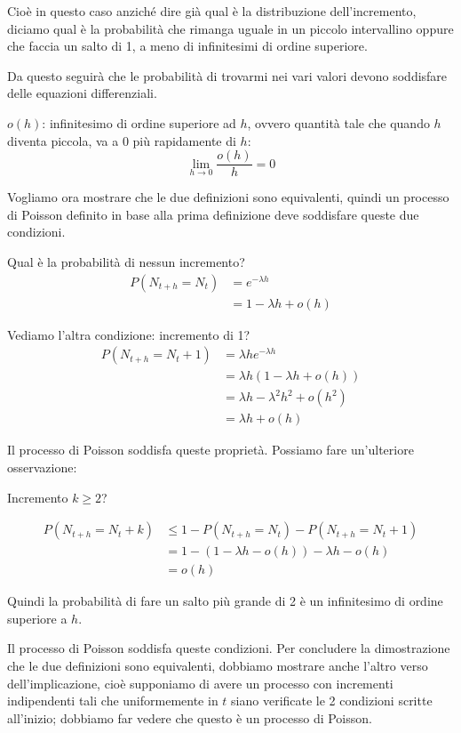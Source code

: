 \documentclass[a4paper,12pt]{book}
\begin{document}
Cioè in questo caso anziché dire già qual è la distribuzione dell'incremento, diciamo qual è la probabilità che rimanga uguale in un piccolo intervallino oppure che faccia un salto di 1, a meno di infinitesimi di ordine superiore.

Da questo seguirà che le probabilità di trovarmi nei vari valori devono soddisfare delle equazioni differenziali. 

$ o(h) $: infinitesimo di ordine superiore ad $ h $, ovvero quantità tale che quando $ h $ diventa piccola, va a 0 più rapidamente di $ h $:
$$ \lim\limits_{h \to 0} \frac{o(h)}{h} = 0 $$

Vogliamo ora mostrare che le due definizioni sono equivalenti, quindi un processo di Poisson definito in base alla prima definizione deve soddisfare queste due condizioni.

Qual è la probabilità di nessun incremento?
\begin{align*}
	P(N_{t+h} = N_t) & = e^{-\lambda h} \\
	& = 1 - \lambda h + o(h)
\end{align*}

Vediamo l'altra condizione: incremento di 1?
\begin{align*}	
	P(N_{t+h} = N_t + 1) & = \lambda h e^{-\lambda h } \\ 
	& = \lambda h (1 - \lambda h + o(h)) \\
	& = \lambda h - \lambda^2 h^2 + o(h^2) \\
	& = \lambda h + o(h)
\end{align*}

Il processo di Poisson soddisfa queste proprietà. Possiamo fare un'ulteriore osservazione:

Incremento $ k \ge 2 $?

\begin{align*}	
	P(N_{t+h} = N_t + k) & \le 1 - P(N_{t+h} = N_t) - P(N_{t+h} = N_t + 1) \\
	& = 1 - (1 - \lambda h - o(h)) - \lambda h - o(h) \\
	& = o(h)
\end{align*}

Quindi la probabilità di fare un salto più grande di 2 è un infinitesimo di ordine superiore a $ h $. 

Il processo di Poisson soddisfa queste condizioni.
Per concludere la dimostrazione che le due definizioni sono equivalenti, dobbiamo mostrare anche l'altro verso dell'implicazione, cioè supponiamo di avere un processo con incrementi indipendenti tali che uniformemente in $ t $ siano verificate le 2 condizioni scritte all'inizio; dobbiamo far vedere che questo è un processo di Poisson. 
\end{document}
